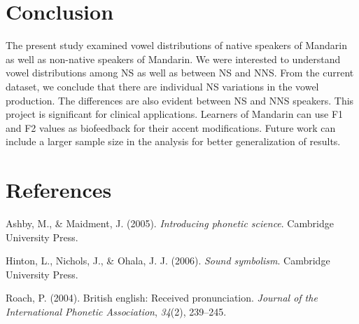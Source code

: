 \documentclass[man, fleqn, noextraspace]{apa6}
\begin{document}
\section{Conclusion}\label{conclusion}

The present study examined vowel distributions of native speakers of
Mandarin as well as non-native speakers of Mandarin. We were interested
to understand vowel distributions among NS as well as between NS and
NNS. From the current dataset, we conclude that there are individual NS
variations in the vowel production. The differences are also evident
between NS and NNS speakers. This project is significant for clinical
applications. Learners of Mandarin can use F1 and F2 values as
biofeedback for their accent modifications. Future work can include a
larger sample size in the analysis for better generalization of results.

\newpage

\section{References}\label{references}

\begingroup
\setlength{\parindent}{-0.5in} \setlength{\leftskip}{0.5in}

\hypertarget{refs}{}
\hypertarget{ref-ashby2005}{}
Ashby, M., \& Maidment, J. (2005). \emph{Introducing phonetic science}.
Cambridge University Press.

\hypertarget{ref-hinton2006}{}
Hinton, L., Nichols, J., \& Ohala, J. J. (2006). \emph{Sound symbolism}.
Cambridge University Press.

\hypertarget{ref-roach2004}{}
Roach, P. (2004). British english: Received pronunciation. \emph{Journal
of the International Phonetic Association}, \emph{34}(2), 239--245.

\endgroup
\end{document}
